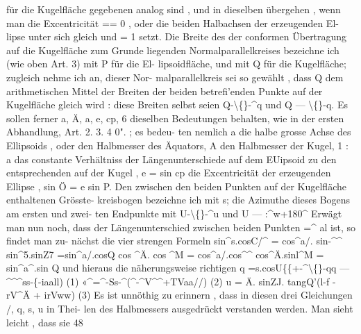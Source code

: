 \documentclass[12pt,a4paper]{article}
\begin{document}
für  die  Kugelfläche  gegebenen  analog  sind ,  und  in  dieselben  übergehen ,  wenn man  die  Excentricität  ==  0 ,  oder  die  beiden  Halbachsen  der  erzeugenden  El- lipse unter  sich  gleich  und    =  1    setzt. Die  Breite  des  der  conformen  Übertragung  auf  die  Kugelfläche  zum  Grunde liegenden  Normalparallelkreises  bezeichne  ich  (wie  oben  Art.  3)  mit  P  für  die  El- lipsoidfläche,  und  mit  Q  für  die  Kugelfläche;  zugleich  nehme  ich  an,  dieser  Nor- malparallelkreis sei  so  gewählt ,  dass  Q  dem  arithmetischen  Mittel  der  Breiten der  beiden  betrefi'enden  Punkte  auf  der  Kugelfläche  gleich  wird :  diese  Breiten selbst  seien  Q-\textbackslash\{\}-\^{}q  und  Q --- \textbackslash\{\}-q.  Es  sollen  ferner  a,  Ä,  a,  e,  cp,  6  dieselben Bedeutungen  behalten,  wie  in  der  ersten  Abhandlung,  Art.  2.  3.  4  0". ;  es  bedeu- ten nemlich a  die  halbe  grosse  Achse  des  Ellipsoids ,  oder  den  Halbmesser  des  Äquators, A  den  Halbmesser  der  Kugel, 1 :  a  das  constante  Verhältniss  der  Längenunterschiede  auf  dem  EUipsoid  zu den  entsprechenden  auf  der  Kugel , e  =  sin  cp    die  Excentricität  der  erzeugenden  Ellipse , sin  Ö  =  e  sin  P. Den  zwischen  den  beiden  Punkten  auf  der  Kugelfläche  enthaltenen  Grösste- kreisbogen  bezeichne  ich  mit  s;  die  Azimuthe  dieses  Bogens  am  ersten  und  zwei- ten Endpunkte  mit  U-\textbackslash\{\}-\^{}u  und  U --- :\^{}w+180\^{}  Erwägt  man  nun  noch,  dass der  Längenunterschied  zwischen  beiden  Punkten  =\^{}  al  ist,  so  findet  man  zu- nächst die  vier  strengen  Formeln sin\^{}s.cosC/\^{}  =  cos\^{}a/.  sin-\^{}\^{} sin\^{}5.sinZ7  =sin\^{}a/.cosQ cos  \^{}Ä.  cos  \^{}M  =  cos\^{}a/.cos\^{}\^{} cos\^{}Ä.sinl\^{}M  =  sin\^{}a\^{}.sin  Q und  hieraus  die  näherungsweise  richtigen q  =s.cosU\{\{+-\^{}\textbackslash\{\}-qq  ---  \^{}\^{}\^{}ss-\{-iaall) (1) «\^{}=\^{}-Ss-\^{}(\^{}-\^{}V\^{}\^{}+TVaa//) (2) u  =  Ä.  sinZJ.  tangQ'(l-f -rV\^{}Ä  +  irVww) (3) Es  ist  unnöthig  zu  erinnern ,  dass  in  diesen  drei  Gleichungen  /,  q,  s,  u  in  Thei- len  des  Halbmessers  ausgedrückt  verstanden  werden.     Man  sieht  leicht ,  dass  sie 48
\end{document}
